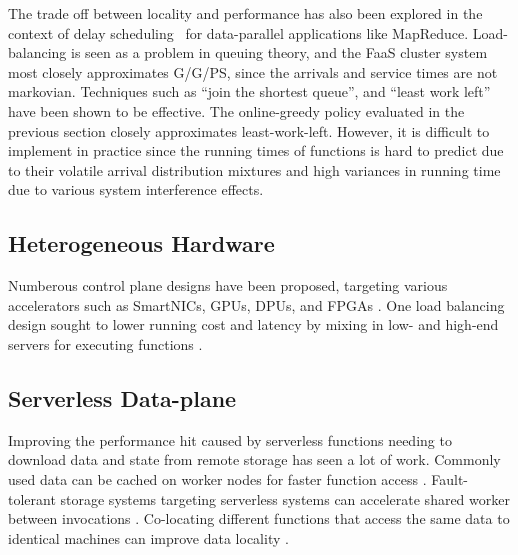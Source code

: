 The trade off between locality and performance has also been explored in the context of delay scheduling~\cite{zaharia2010delay} for data-parallel applications like MapReduce.
Load-balancing is seen as a  problem in queuing theory, and the FaaS cluster system most closely approximates G/G/PS, since the arrivals and service times are not markovian.
Techniques such as ``join the shortest queue'', and ``least work left''~\cite{gupta2007analysis} have been shown to be effective.
The online-greedy policy evaluated in the previous section closely approximates least-work-left.
However, it is difficult to implement in practice since the running times of functions is hard to predict due to their volatile arrival distribution mixtures and high variances in running time due to various system interference effects.


\subsection{Heterogeneous Hardware}

Numberous control plane designs have been proposed, targeting various accelerators such as SmartNICs, GPUs, DPUs, and FPGAs \cite{choi2020lambda,du2022serverless,pemberton2022kernel,daw2021speedo}.
One load balancing design sought to lower running cost and latency by mixing in low- and high-end servers for executing functions \cite{roy2022icebreaker}.

\subsection{Serverless Data-plane}

Improving the performance hit caused by serverless functions needing to download data and state from remote storage has seen a lot of work.
Commonly used data can be cached on worker nodes for faster function access \cite{mvondo2021ofc,romero2021faa}.
Fault-tolerant storage systems targeting serverless systems can accelerate shared worker between invocations \cite{giantsidi2023flexlog,sreekanti2020fault}.
Co-locating different functions that access the same data to identical machines can improve data locality \cite{abdi2023palette}.

